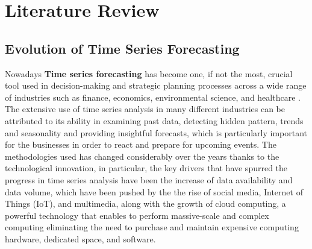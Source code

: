\chapter{Literature Review}

\section{Evolution of Time Series Forecasting} %


Nowadays \textbf{Time series forecasting} has become one, if not the most, crucial tool used in decision-making and strategic planning processes across a wide range of industries such as finance, economics, environmental science, and healthcare \cite{article}. The extensive use of time series analysis in many different industries can be attributed to its ability in examining past data, detecting hidden pattern, trends and seasonality and providing insightful forecasts, which is particularly important for the businesses in order to react and prepare for upcoming events. The methodologies used has changed considerably over the years thanks to the technological innovation, in  particular, the key drivers that have spurred the progress in time series analysis have been the increase of data availability and data volume, which have been pushed by the the rise of social media, Internet of Things (IoT), and multimedia, along with the growth of cloud computing, a powerful technology that enables to perform massive-scale and complex computing eliminating the need to purchase and maintain expensive computing hardware, dedicated space, and software\cite{HASHEM201598}.
